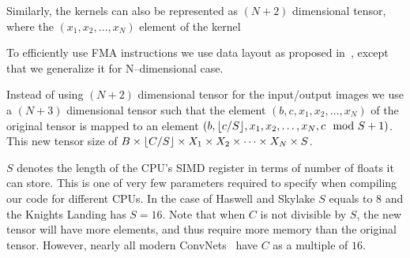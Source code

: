   Similarly, the kernels can also be represented as $(N+2)$
  dimensional tensor, where the $(x_1,x_2,\dots,x_N)$ element of the kernel

  To efficiently use FMA instructions we use data layout as proposed
  in~\cite{jeffers2016knl, cpu-myth}, except that we generalize it for
  N--dimensional case.

  Instead of using $(N+2)$ dimensional tensor for the input/output
  images we use a $(N+3)$ dimensional tensor such that the element
  $(b,c,x_1,x_2,\dots,x_N)$ of the original tensor is mapped to an
  element $(b,\lfloor c/S\rfloor,x_1,x_2,\dots,x_N,c \mod S + 1)$.  This new
  tensor size of $B \times \lfloor C/S\rfloor \times X_1 \times X_2 \times
  \dots \times X_N \times S$.

  $S$ denotes the length of the CPU's SIMD register in terms of number
  of floats it can store.  This is one of very few parameters required
  to specify when compiling our code for different CPUs.  In the case
  of Haswell and Skylake $S$ equals to $8$ and the Knights Landing has
  $S=16$.  Note that when $C$ is not divisible by $S$, the new tensor
  will have more elements, and thus require more memory than the
  original tensor.  However, nearly all modern ConvNets~ have $C$ as a multiple of $16$.
